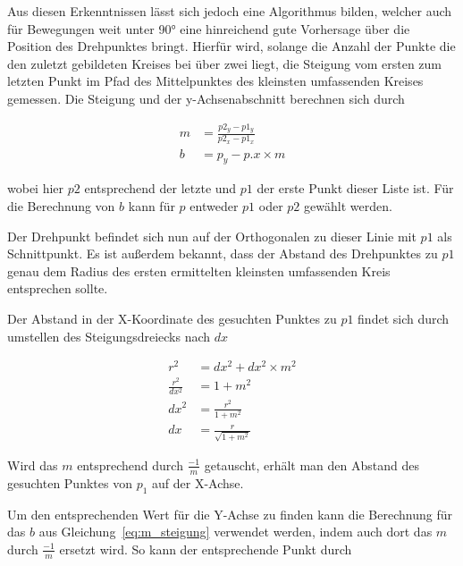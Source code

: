 
Aus diesen Erkenntnissen lässt sich jedoch eine Algorithmus bilden, welcher auch für Bewegungen weit unter 90° eine hinreichend gute Vorhersage über die Position des Drehpunktes bringt.
Hierfür wird, solange die Anzahl der Punkte die den zuletzt gebildeten Kreises bei über zwei liegt, die Steigung vom ersten zum letzten Punkt im Pfad des Mittelpunktes des kleinsten umfassenden Kreises gemessen.
Die Steigung und der y-Achsenabschnitt berechnen sich durch

\begin{equation}
    \begin{split}
    m &= \frac{p2_y - p1_y}{p2_x - p1_x} \\
    b &= p_y - p.x \times m
    \end{split}
    \label{eq:m_steigung}
\end{equation}

wobei hier $p2$ entsprechend der letzte und $p1$ der erste Punkt dieser Liste ist.
Für die Berechnung von $b$ kann für $p$ entweder $p1$ oder $p2$ gewählt werden.

Der Drehpunkt befindet sich nun auf der Orthogonalen zu dieser Linie mit $p1$ als Schnittpunkt.
Es ist außerdem bekannt, dass der Abstand des Drehpunktes zu $p1$ genau dem Radius des ersten ermittelten kleinsten umfassenden Kreis entsprechen sollte.

Der Abstand in der X-Koordinate des gesuchten Punktes zu $p1$ findet sich durch umstellen des Steigungsdreiecks nach $dx$

\begin{equation}
    \begin{split}
    r^2 &= dx^2 + dx^2 \times m^2 \\
    \frac{r^2}{dx^2} &= 1 + m^2 \\
    dx^2 &= \frac{r^2}{1+m^2} \\
    dx &= \frac{r}{\sqrt{1 + m^2}}
    \end{split}
    \label{eq:steigungsdreieck}
\end{equation}

Wird das $m$ entsprechend durch $\frac{-1}{m}$ getauscht, erhält man den Abstand des gesuchten Punktes von $p_1$ auf der X-Achse.

Um den entsprechenden Wert für die Y-Achse zu finden kann die Berechnung für das $b$ aus Gleichung~\ref{eq:m_steigung} verwendet werden, indem auch dort das $m$ durch $\frac{-1}{m}$ ersetzt wird.
So kann der entsprechende Punkt durch

